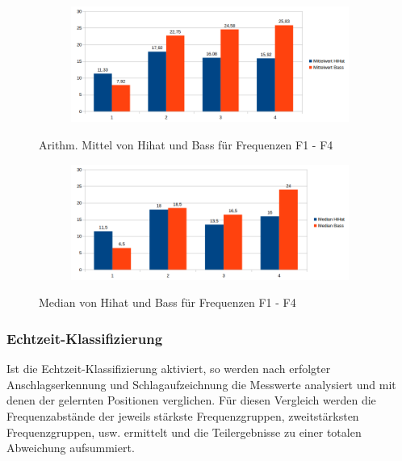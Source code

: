 \begin{table}[H]
\begin{tabular}{l c c c c | l c c c c}
	\end{tabular}
	\label{tab:FFT}
\end{table}

\begin{figure}[H]
\centering
\begin{subfigure}{.5\textwidth}
		\includegraphics[scale=0.5]{figures/Mittelwert_2.png}
\end{subfigure}
\caption{Arithm. Mittel von Hihat und Bass für Frequenzen F1 - F4}
\label{fig:FFT_Mittelwerte}
\end{figure}


\begin{figure}[H]
\centering
\begin{subfigure}{.5\textwidth}
		\includegraphics[scale=0.5]{figures/Median_2.png}
\end{subfigure}
\caption{Median von Hihat und Bass für Frequenzen F1 - F4}
\label{fig:FFT_Median}
\end{figure}


\subsubsection{Echtzeit-Klassifizierung}
Ist die Echtzeit-Klassifizierung aktiviert, so werden nach erfolgter Anschlagserkennung und Schlagaufzeichnung die Messwerte analysiert und mit denen der gelernten Positionen verglichen. 
Für diesen Vergleich werden die Frequenzabstände der jeweils stärkste Frequenzgruppen, zweitstärksten Frequenzgruppen, usw. ermittelt und die Teilergebnisse zu einer totalen Abweichung aufsummiert.

